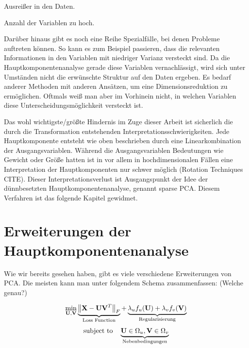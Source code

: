 Ausreißer in den Daten.

Anzahl der Variablen zu hoch.

Darüber hinaus gibt es noch eine Reihe Spezialfälle, bei denen Probleme auftreten können. So kann es zum Beispiel passieren, dass die relevanten Informationen in den Variablen mit niedriger Varianz versteckt sind. Da die Hauptkomponentenanalyse gerade diese Variablen vernachlässigt, wird sich unter Umständen nicht die erwünschte Struktur auf den Daten ergeben. Es bedarf anderer Methoden mit anderen Ansätzen, um eine Dimensionsreduktion zu ermöglichen. Oftmals weiß man aber im Vorhinein nicht, in welchen Variablen diese Unterscheidungsmöglichkeit versteckt ist.

Das wohl wichtigste/größte Hindernis im Zuge dieser Arbeit ist sicherlich die durch die Transformation entstehenden Interpretationsschwierigkeiten. Jede Hauptkomponente entsteht wie oben beschrieben durch eine Linearkombination der Ausgangsvariablen. Während die Ausgangsvariablen Bedeutungen wie Gewicht oder Größe hatten ist in vor allem in hochdimensionalen Fällen eine Interpretation der Hauptkomponenten nur schwer möglich (Rotation Techniques CITE). Dieser Interpretationsverlust ist Ausgangspunkt der Idee der dünnbesetzten Hauptkomponentenanalyse, genannt sparse PCA. Diesem Verfahren ist das folgende Kapitel gewidmet.

\section{Erweiterungen der Hauptkomponentenanalyse}
Wie wir bereits gesehen haben, gibt es viele verschiedene Erweiterungen von PCA. Die meisten kann man unter folgendem Schema zusammenfassen: (Welche genau?)

$$\min_{\mathbf{U},\mathbf{V}} \underbrace{\left\lVert \mathbf{X} - \mathbf{U}\mathbf{V}^T \right\rVert_F}_{\text{Loss Function}} + \underbrace{\lambda_u f_u(\mathbf{U}) + \lambda_v f_v(\mathbf{V})}_{\text{Regularisierung}}$$
$$\text{subject to} \quad \underbrace{\mathbf{U} \in \Omega_u, \mathbf{V} \in \Omega_v}_{\text{Nebenbedingungen}}$$

